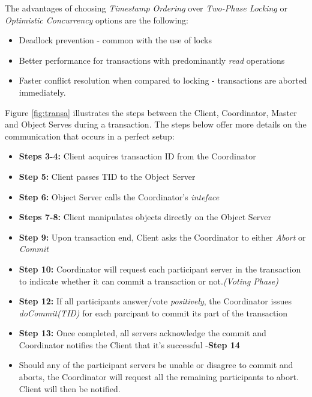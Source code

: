 \documentclass[times, 10pt,twocolumn]{article}
\begin{document}
The advantages of choosing {\it Timestamp Ordering} over {\it Two-Phase Locking} or {\it Optimistic Concurrency} options are the following: 
\begin{itemize}[noitemsep, nolistsep]
\item Deadlock prevention - common with the use of locks
\item Better performance for transactions with predominantly {\it read} operations \cite{bernstein1987concurrency}
\item Faster conflict resolution when compared to locking - transactions are aborted immediately.
\end{itemize}

Figure \ref{fig:transa} illustrates the steps between the Client, Coordinator, Master and Object Serves during a transaction. The steps below offer more details on the communication that occurs in a perfect setup: 

\begin{itemize}[noitemsep, nolistsep]
\item {\bf Steps 3-4:} Client acquires transaction ID from the Coordinator 
\item {\bf Step 5:} Client passes TID to the Object Server
\item {\bf Step 6:} Object Server calls the Coordinator's {\it inteface}
\item {\bf Steps 7-8:} Client manipulates objects directly on the Object Server
\item {\bf Step 9:} Upon transaction end, Client asks the Coordinator to either {\it Abort} or {\it Commit} 
\item {\bf Step 10:} Coordinator will request each participant server in the transaction to indicate whether it can commit a transaction or not.{\it (Voting Phase)}
\item {\bf Step 12:} If all participants answer/vote {\it positively}, the Coordinator issues {\it doCommit(TID)} for each parcipant to commit its part of the transaction
\item {\bf Step 13:} Once completed, all servers acknowledge the commit and Coordinator notifies the Client that it's successful -{\bf Step 14}
\item Should any of the participant servers be unable or disagree to commit and aborts, the Coordinator will request all the remaining participants to abort. Client will then be notified.
\end{itemize}
\end{document}
